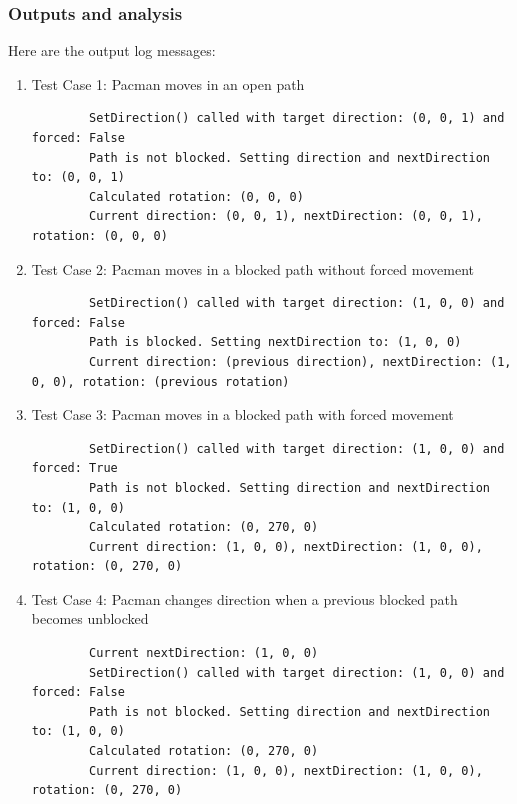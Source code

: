 \documentclass[11pt]{article}
\begin{document}
    \subsubsection*{Outputs and analysis}
    Here are the output log messages:

    \begin{enumerate}
        \item Test Case 1: Pacman moves in an open path
        \begin{lstlisting}
        SetDirection() called with target direction: (0, 0, 1) and forced: False
        Path is not blocked. Setting direction and nextDirection to: (0, 0, 1)
        Calculated rotation: (0, 0, 0)
        Current direction: (0, 0, 1), nextDirection: (0, 0, 1), rotation: (0, 0, 0)
        \end{lstlisting}

        \item Test Case 2: Pacman moves in a blocked path without forced movement
        \begin{lstlisting}
        SetDirection() called with target direction: (1, 0, 0) and forced: False
        Path is blocked. Setting nextDirection to: (1, 0, 0)
        Current direction: (previous direction), nextDirection: (1, 0, 0), rotation: (previous rotation)
        \end{lstlisting}

        \item Test Case 3: Pacman moves in a blocked path with forced movement
        \begin{lstlisting}
        SetDirection() called with target direction: (1, 0, 0) and forced: True
        Path is not blocked. Setting direction and nextDirection to: (1, 0, 0)
        Calculated rotation: (0, 270, 0)
        Current direction: (1, 0, 0), nextDirection: (1, 0, 0), rotation: (0, 270, 0)
        \end{lstlisting}

        \item Test Case 4: Pacman changes direction when a previous blocked path becomes unblocked
        \begin{lstlisting}
        Current nextDirection: (1, 0, 0)
        SetDirection() called with target direction: (1, 0, 0) and forced: False
        Path is not blocked. Setting direction and nextDirection to: (1, 0, 0)
        Calculated rotation: (0, 270, 0)
        Current direction: (1, 0, 0), nextDirection: (1, 0, 0), rotation: (0, 270, 0)
        \end{lstlisting}
    \end{enumerate}
\end{document}
